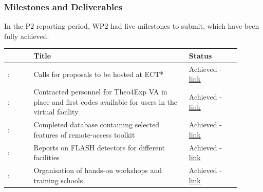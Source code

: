 \subsubsection*{Milestones and Deliverables}
In the P2 reporting period, WP2 had five milestones to submit, which have been fully achieved.
{\fontsize{9}{11}\selectfont
\begin{center}
  \begin{tabular}[t]{!{\color{mygray}\vrule}p{0.10\linewidth}!
  {\color{mygray}\vrule}p{0.60\linewidth}!
  {\color{mygray}\vrule}p{0.20\linewidth}!{\color{mygray}\vrule} } \hline
     & {\bf Title} & {\bf Status} \\ \hline
    : &Calls for proposals to be hosted at ECT*&  Achieved - \href{https://web.infn.it/EURO-LABS/wp-content/uploads/2024/05/EURO-LABS_MS8-Final-1.pdf} {link}  \\ \hline
    : & Contracted personnel for Theo4Exp VA in place and first codes available for users in the virtual facility & Achieved - \href{https://web.infn.it/EURO-LABS/wp-content/uploads/2024/05/EURO-LABS_MS10_The4Exp_02_2024_FINAL-1.pdf}{link} \\ \hline    
    : & Completed database containing selected features of remote-access toolkit & Achieved - \href{https://web.infn.it/EURO-LABS/wp-content/uploads/2024/05/EURO-LABS_MS12-Report-RemoteAccess_Final.pdf}{link} \\ \hline 
    : & Reports on FLASH detectors for different facilities & Achieved - \href{https://web.infn.it/EURO-LABS/wp-content/uploads/2024/05/EURO-LABS_MS14_Report.pdf}{link} \\ \hline 
    : & 	Organisation of hands-on workshops and training schools & Achieved - \href{https://zenodo.org/records/15039933}{link} \\ \hline 
  \end{tabular}
\end{center}
}

